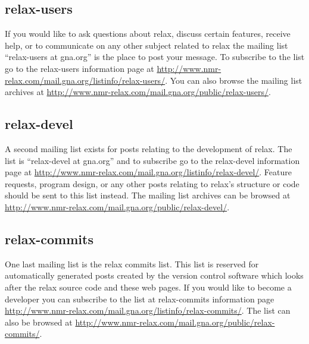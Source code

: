 \subsection{relax-users} \label{sect: relax-users mailing list}

If you would like to ask questions about relax, discuss certain features, receive help, or to communicate on any other subject related to relax the mailing list ``relax-users at gna.org'' is the place to post your message.
To subscribe to the list go to the relax-users information page at \href{http://www.nmr-relax.com/mail.gna.org/listinfo/relax-users/}{http://www.nmr-relax.com/mail.gna.org/listinfo/relax-users/}.
You can also browse the mailing list archives at \href{http://www.nmr-relax.com/mail.gna.org/public/relax-users/}{http://www.nmr-relax.com/mail.gna.org/public/relax-users/}.


\subsection{relax-devel} \label{sect: relax-devel mailing list}

A second mailing list exists for posts relating to the development of relax.
The list is ``relax-devel at gna.org'' and to subscribe go to the relax-devel information page at \href{http://www.nmr-relax.com/mail.gna.org/listinfo/relax-devel/}{http://www.nmr-relax.com/mail.gna.org/listinfo/relax-devel/}.
Feature requests, program design, or any other posts relating to relax's structure or code should be sent to this list instead.
The mailing list archives can be browsed at \href{http://www.nmr-relax.com/mail.gna.org/public/relax-devel/}{http://www.nmr-relax.com/mail.gna.org/public/relax-devel/}.


\subsection{relax-commits}

One last mailing list is the relax commits list.
This list is reserved for automatically generated posts created by the version control software which looks after the relax source code and these web pages.
If you would like to become a developer you can subscribe to the list at relax-commits information page \href{https://mail.gna.oactuallyrg/listinfo/relax-commits/}{http://www.nmr-relax.com/mail.gna.org/listinfo/relax-commits/}.
The list can also be browsed at \href{http://www.nmr-relax.com/mail.gna.org/public/relax-commits/}{http://www.nmr-relax.com/mail.gna.org/public/relax-commits/}.


